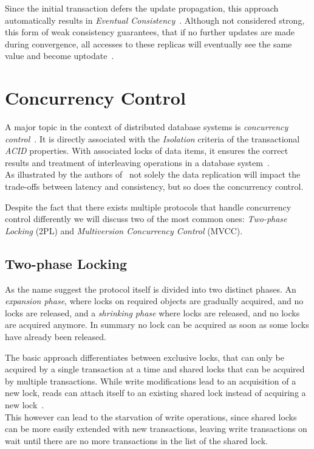 Since the initial transaction defers the update propagation, this approach automatically results in \emph{Eventual Consistency}~\cite{shapiro:2011}.
Although not considered strong, this form of weak consistency guarantees, that if no further updates are made 
during convergence, all accesses to these replicas will eventually see the same value and become uptodate~\cite{quorums:2003}.




\section{Concurrency Control}
\label{sec:concurrency_control}

A major topic in the context of distributed database systems is \emph{concurrency control}~\cite{bernstein:1981}.
It is directly associated with the \emph{Isolation} criteria of the transactional \emph{ACID} properties.
With associated locks of data items, it ensures the correct results and treatment of interleaving operations in a database system~\cite{bernstein:1986}.
\\
As illustrated by the authors of~\cite{weikum:2001} not solely the data replication will impact the trade-offs between latency and consistency,
but so does the concurrency control.

Despite the fact that there exists multiple protocols that handle concurrency control differently we will discuss two of the most common ones: 
\emph{Two-phase Locking} (2PL) and \emph{Multiversion Concurrency Control} (MVCC).




\subsection{Two-phase Locking}

As the name suggest the protocol itself is divided into two distinct phases. An \emph{expansion phase}, where locks on required objects are gradually acquired, 
and no locks are released, and a \emph{shrinking phase} where locks are released, and no locks are acquired anymore.
In summary no lock can be acquired as soon as some locks have already been released.

The basic approach differentiates between exclusive locks, that can only be acquired by a single transaction at a time and shared locks that 
can be acquired by multiple transactions. While write modifications lead to an acquisition of a new lock, reads can attach itself to an existing shared lock 
instead of acquiring a new lock~\cite{mehrotra:1997}. \\
This however can lead to the starvation of write operations, since shared locks can be more easily extended with new transactions, leaving write transactions on wait until 
there are no more transactions in the list of the shared lock. 

